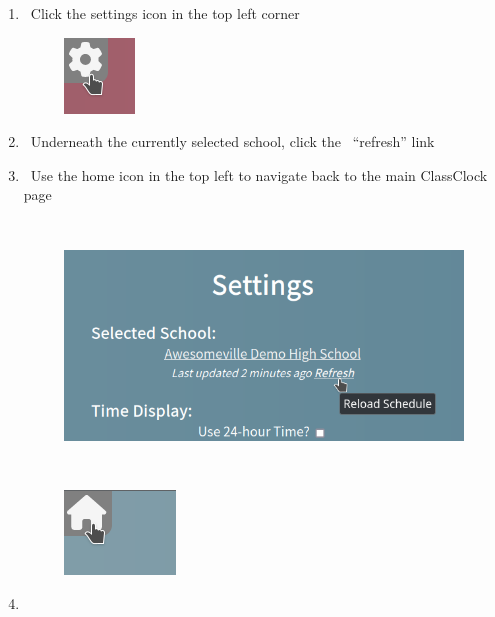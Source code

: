 \documentclass{article}
\begin{document}
\begin{enumerate}
\item {\ Click the settings icon in the top left corner}
\begin{figure}
\includegraphics[width=0.7398in,height=0.7917in]{Mini20Manual-img014.png}\end{figure}
\item {\ Underneath the currently selected school, click the \ “refresh” link }
\item {\ Use the home icon in the top left to navigate back to the main ClassClock page}
\begin{figure}
\includegraphics[width=5.511in,height=2.6335in]{Mini20Manual-img015.png}\end{figure}
\begin{figure}
\includegraphics[width=1.1661in,height=0.8846in]{Mini20Manual-img016.png}\end{figure}
\item {}
\begin{figure}

\end{figure}
\end{enumerate}
\end{document}
